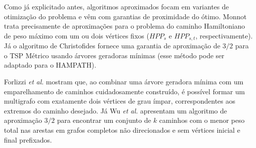 Como já explicitado antes, algoritmos aproximados focam em variantes de otimização do problema e vêm com garantias de proximidade do ótimo. Monnot \cite{MONNOT2005} trata precisamente de aproximações para o problema do caminho Hamiltoniano de peso máximo com um ou dois vértices fixos ($HPP_s$ e $HPP_{s,t}$, respectivamente). Já o algoritmo de Christofides \cite{Christofides2022} fornece uma garantia de aproximação de $3/2$ para o TSP Métrico usando árvores geradoras mínimas (esse método pode ser adaptado para o HAMPATH).

Forlizzi \textit{et al.} \cite{Forlizzi2005} mostram que, ao combinar uma árvore geradora mínima com um emparelhamento de caminhos cuidadosamente construído, é possível formar um multigrafo com exatamente dois vértices de grau ímpar, correspondentes aos extremos do caminho desejado. Já Wu \textit{et al.} \cite{WU2023} apresentam um algoritmo de aproximação $3/2$ para encontrar um conjunto de $k$ caminhos com o menor peso total nas arestas em grafos completos não direcionados e sem vértices inicial e final prefixados. 